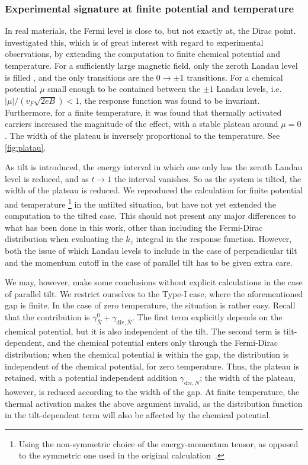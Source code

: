 \subsubsection{Experimental signature at finite potential and temperature}
In real materials, the Fermi level is close to, but not exactly at, the Dirac point.
\textcite{arjonaFingerprintsConformalAnomaly2019} investigated this, which is of great interest with regard to experimental observations, by extending the computation to finite chemical potential and temperature.
For a sufficiently large magnetic field, only the zeroth Landau level is filled \cite{arjonaFingerprintsConformalAnomaly2019,vozmedianoTheoreticalPhysicsColloquium2021}, and the only transitions are the \( 0 \to \pm 1 \) transitions.
For a chemical potential \( \mu \) small enough to be contained between the \( \pm 1 \) Landau levels, i.e. \( |\mu| /(v_F \sqrt{2eB} ) < 1 \), the response function was found to be invariant.
Furthermore, for a finite temperature, it was found that thermally activated carriers increased the magnitude of the effect, with a stable plateau around \( \mu = 0 \).
The width of the plateau is inversely proportional to the temperature.
See \cref{fig:platau}.

As tilt is introduced, the energy interval in which one only has the zeroth Landau level is reduced, and as \( t \to 1 \) the interval vanishes.
So as the system is tilted, the width of the plateau is reduced.
We reproduced the calculation for finite potential and temperature%
\footnote{Using the non-symmetric choice of the energy-momentum tensor, as opposed to the symmetric one used in the original calculation~\cite{arjonaFingerprintsConformalAnomaly2019}.}
in the untilted situation, but have not yet extended the computation to the tilted case.
This should not present any major differences to what has been done in this work, other than including the Fermi-Dirac distribution when evaluating the \( k_z \) integral in the response function.
However, both the issue of which Landau levels to include in the case of perpendicular tilt and the momentum cutoff in the case of parallel tilt has to be given extra care.

We may, however, make some conclusions without explicit calculations in the case of parallel tilt.
We restrict ourselves to the Type-I case, where the aforementioned gap is finite.
In the case of zero temperature, the situation is rather easy.
Recall that the contribution is \( \gamma^0_{\bar{N}} + \gamma_{\text{div}, \bar{N}} \).
The first term explicitly depends on the chemical potential, but it is also independent of the tilt.
The second term is tilt-dependent, and the chemical potential enters only through the Fermi-Dirac distribution;
when the chemical potential is within the gap, the distribution is independent of the chemical potential, for zero temperature.
Thus, the plateau is retained, with a potential independent addition \( \gamma_{\text{div},N} \);
the width of the plateau, however, is reduced according to the width of the gap.
At finite temperature, the thermal activation makes the above argument invalid, as the distribution function in the tilt-dependent term will also be affected by the chemical potential.

